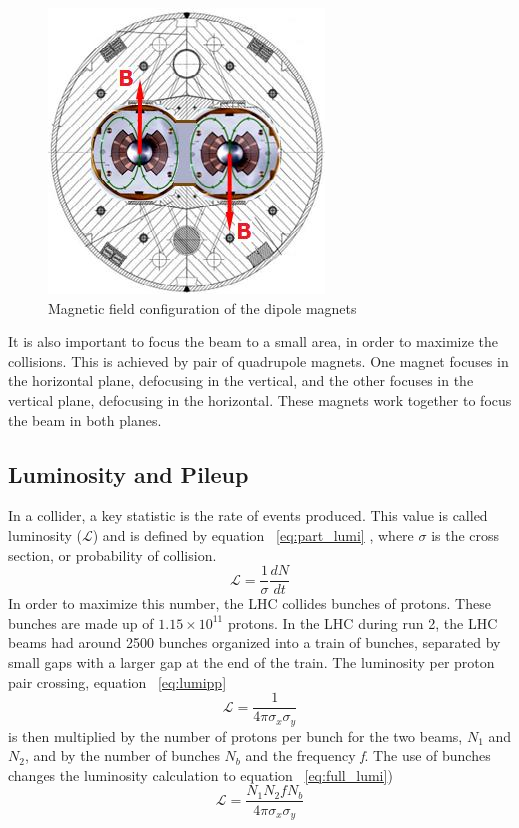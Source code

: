 \begin{figure}[h]
\begin{center}
\includegraphics[scale=0.65]{figures/dipole_bfield}
\caption{Magnetic field configuration of the dipole magnets \cite{Lorentz}}
\label{Fig:bfield}
\end{center}
\end{figure}

\indent	It is also important to focus the beam to a small area, in order to maximize the collisions. This is achieved by 
pair of quadrupole magnets. One magnet focuses in the horizontal plane, defocusing in the vertical, and the other focuses in the vertical plane, defocusing in the horizontal. These magnets work together to focus the beam in both planes. 
\subsection{Luminosity and Pileup}
In a collider, a key statistic is the rate of events produced. This value is called luminosity (${\mathcal{L}}$) and is defined by equation ~\ref{eq:part_lumi} \cite{Aaboud:2016hhf}, where ${\sigma}$ is the cross section, or probability of collision.
\begin{equation}
\label{eq:part_lumi}
\mathcal{L} = \frac{1}{\sigma}\frac{dN}{dt}
\end{equation}
In order to maximize this number, the LHC collides bunches of protons. These bunches are made up of ${1.15\times10^{11}}$ protons. In the LHC during run 2, the LHC beams had around 2500 bunches organized into a train of bunches, separated by small gaps with a larger gap at the end of the train. The luminosity per proton pair crossing, equation ~\ref{eq:lumipp}
\begin{equation}
\label{eq:lumipp}
\mathcal{L} = \frac{1}{4\pi\sigma_{x}\sigma_{y}}
\end{equation}
is then multiplied by the number of protons per bunch for the two beams, ${N_{1}}$ and ${N_{2}}$, and by the number of bunches ${N_{b}}$ and the frequency \textit{f}. The use of bunches changes the luminosity calculation to equation ~\ref{eq:full_lumi})
\linebreak
\begin{equation}
\label{eq:full_lumi}
\mathcal{L} = \frac{N_{1}N_{2}fN_{b}}{4\pi\sigma_{x}\sigma_{y}}
\end{equation}

